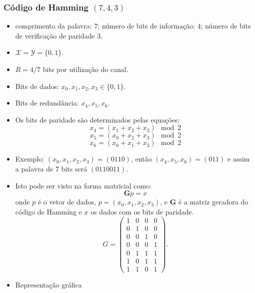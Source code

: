 \begin{frame}[allowframebreaks]
  \frametitle{Código de Hamming $(7,4,3)$}
  \begin{itemize}
  \item comprimento da palavra: $7$; número de bits de informação: $4$; número de bits de verificação de paridade $3$.
  \item $\mathcal{X} = \mathcal{Y} = \{0,1\}$.
  \item $R = 4/7$ bits por utilização do canal.
  \item Bits de dados: $x_0, x_1, x_2, x_3 \in \{0,1\}$.
  \item Bits de redundância: $x_4, x_5, x_6$.
  \item Os bits de paridade são determinados pelas equações:
	\begin{equation}
	x_4 = (x_1 + x_2 + x_3) \mod 2
	\end{equation}
        \begin{equation}
        x_5 = (x_0 + x_2 + x_3) \mod 2
        \end{equation}
        \begin{equation}
        x_6 = (x_0 + x_1 + x_3) \mod 2
        \end{equation}
  \item Exemplo: $(x_0, x_1, x_2, x_3) = (0110)$, então $(x_4,x_5,x_6) = (011)$ e assim a palavra de 7 bits
	será $(0110011)$.
  \item Isto pode ser visto na forma matricial como:
	\begin{equation}
	\mathbf{G} p = x
	\end{equation}
	onde $p$ é o vetor de dados, $p = (x_0, x_1, x_2, x_3)$, e 
	$\mathbf{G}$ é a matriz geradora do código de Hamming e $x$
	os dados com os bits de paridade.
	\begin{equation}
	G = 
        \begin{pmatrix}
	1 & 0 & 0 & 0 \\
	0 & 1 & 0 & 0 \\
	0 & 0 & 1 & 0 \\
	0 & 0 & 0 & 1 \\
	0 & 1 & 1 & 1 \\
	1 & 0 & 1 & 1 \\
	1 & 1 & 0 & 1
	\end{pmatrix}.
	\end{equation}  

  \item Representação gráfica


\end{itemize}
\end{frame}
